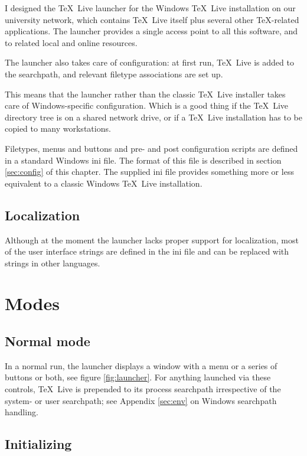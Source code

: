 \documentclass[11pt,a4paper,oneside]{report}
\def\TL{\TeX~Live}
\begin{document}
I designed the \TL{} launcher for the Windows \TL{} installation on
our university network, which contains \TL{} itself plus several
other \TeX-related applications.  The launcher provides a single
access point to all this software, and to related local and online
resources.

The launcher also takes care of configuration: at first run, \TL{}
is added to the searchpath, and relevant filetype associations are
set up.

This means that the launcher rather than the classic \TL{} installer
takes care of Windows-specific configuration. Which is a good
thing if the \TL{} directory tree is on a shared network drive, or
if a \TL{} installation has to be copied to many workstations.

Filetypes, menus and buttons and pre- and post configuration scripts
are defined in a standard Windows ini file. The format of this file
is described in section \ref{sec:config} of this chapter.  The
supplied ini file provides something more or less equivalent to a
classic Windows \TL{} installation.

\subsection{Localization}
\label{sec:localize}

Although at the moment the launcher lacks proper support for
localization, most of the user interface strings are defined in the
ini file and can be replaced with strings in other languages.

\section{Modes}
\label{sec:modes}

\subsection{Normal mode}
\label{sec:normal}

In a normal run, the launcher displays a window with a menu or a
series of buttons or both, see figure \ref{fig:launcher}. For
anything launched via these controls, \TL{} is prepended to its
process searchpath irrespective of the system- or user
searchpath; see Appendix \ref{sec:env} on Windows searchpath
handling.

\subsection{Initializing}
\label{sec:init}
\end{document}
